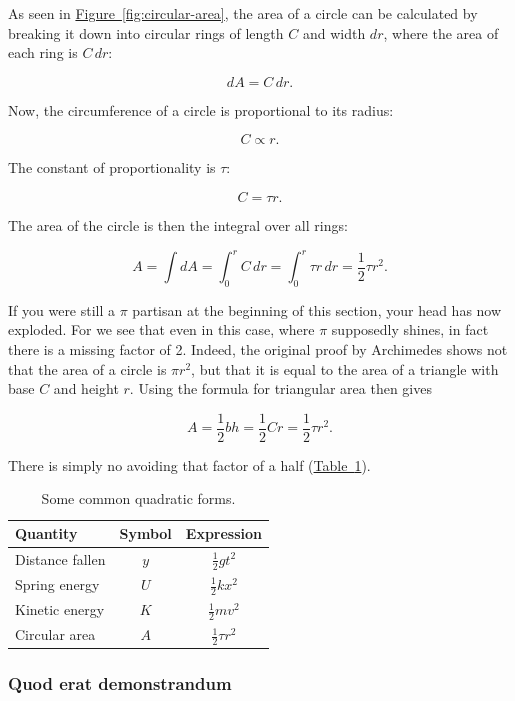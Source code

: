 \documentclass{article}
\begin{document}
As seen in \hyperref[fig:circular-area]{Figure~}\ref{fig:circular-area}, the area of a circle can be calculated by breaking it down into circular rings of length $C$ and width $dr$, where the area of each ring is $C\,dr$:

\[ dA = C\,dr. \]


\noindent Now, the circumference of a circle is proportional to its radius:

\[ C \propto r. \]

\noindent The constant of proportionality is $\tau$:

\[ C = \tau r. \]

\noindent The area of the circle is then the integral over all rings:

\[ A = \int dA = \int_0^r C\,dr = \int_0^r \tau r\,dr = \textstyle{\frac{1}{2}} \tau r^2. \]

If you were still a $\pi$ partisan at the beginning of this section, your head has now exploded. For we see that even in this case, where $\pi$ supposedly shines, in fact there is a missing factor of 2. Indeed, the original proof by Archimedes shows not that the area  of a circle is $\pi r^2$, but that it is equal to the area of a triangle with base $C$ and height $r$. Using the formula for triangular area then gives

\[
  A = \textstyle{\frac{1}{2}} bh = \textstyle{\frac{1}{2}}Cr = \textstyle{\frac{1}{2}}\tau r^2.
\]

\noindent There is simply no avoiding that factor of a half  (\hyperref[table:quadratic_forms]{Table~}\ref{table:quadratic_forms}).

\begin{table}
\begin{center}
\begin{tabular}{lcc}
Quantity & Symbol & Expression \\ \hline
Distance fallen & $y$ & $\textstyle{\frac{1}{2}}gt^2$ \\
Spring energy & $U$ & $\textstyle{\frac{1}{2}}kx^2$ \\
Kinetic energy & $K$ & $\textstyle{\frac{1}{2}}mv^2$ \\
Circular area & $A$ & $\textstyle{\frac{1}{2}}\tau r^2$
\end{tabular}
\end{center}
\caption{Some common quadratic forms.\label{table:quadratic_forms}}
\end{table}

    \subsubsection{Quod erat demonstrandum} %
    \label{sec:quod_erat_demonstrandum}
    
\end{document}
